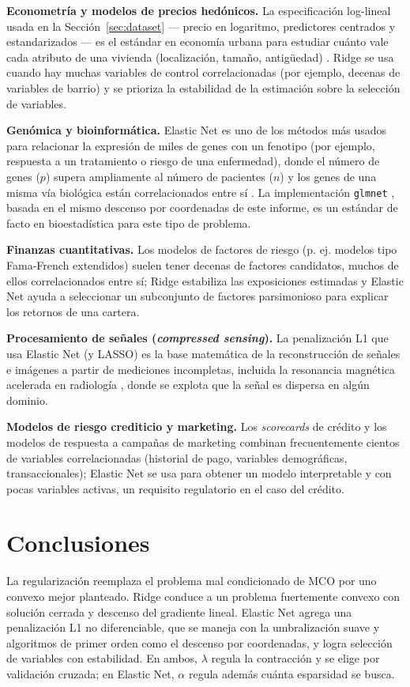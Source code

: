\documentclass[11pt,a4paper]{article}
\theoremstyle{simple}
\begin{document}
\textbf{Econometría y modelos de precios hedónicos.} La especificación log-lineal usada en la Sección~\ref{sec:dataset} --- precio en logaritmo, predictores centrados y estandarizados --- es el estándar en economía urbana para estudiar cuánto vale cada atributo de una vivienda (localización, tamaño, antigüedad) \cite{hastie2009}. Ridge se usa cuando hay muchas variables de control correlacionadas (por ejemplo, decenas de variables de barrio) y se prioriza la estabilidad de la estimación sobre la selección de variables.

\textbf{Genómica y bioinformática.} Elastic Net es uno de los métodos más usados para relacionar la expresión de miles de genes con un fenotipo (por ejemplo, respuesta a un tratamiento o riesgo de una enfermedad), donde el número de genes ($p$) supera ampliamente al número de pacientes ($n$) y los genes de una misma vía biológica están correlacionados entre sí \cite{zou2005}. La implementación \texttt{glmnet} \cite{friedman2010}, basada en el mismo descenso por coordenadas de este informe, es un estándar de facto en bioestadística para este tipo de problema.

\textbf{Finanzas cuantitativas.} Los modelos de factores de riesgo (p. ej. modelos tipo Fama-French extendidos) suelen tener decenas de factores candidatos, muchos de ellos correlacionados entre sí; Ridge estabiliza las exposiciones estimadas y Elastic Net ayuda a seleccionar un subconjunto de factores parsimonioso para explicar los retornos de una cartera.

\textbf{Procesamiento de señales (\textit{compressed sensing}).} La penalización L1 que usa Elastic Net (y LASSO) es la base matemática de la reconstrucción de señales e imágenes a partir de mediciones incompletas, incluida la resonancia magnética acelerada en radiología \cite{beck2009}, donde se explota que la señal es dispersa en algún dominio.

\textbf{Modelos de riesgo crediticio y marketing.} Los \textit{scorecards} de crédito y los modelos de respuesta a campañas de marketing combinan frecuentemente cientos de variables correlacionadas (historial de pago, variables demográficas, transaccionales); Elastic Net se usa para obtener un modelo interpretable y con pocas variables activas, un requisito regulatorio en el caso del crédito.

\section{Conclusiones}
La regularización reemplaza el problema mal condicionado de MCO por uno convexo mejor planteado. Ridge conduce a un problema fuertemente convexo con solución cerrada y descenso del gradiente lineal. Elastic Net agrega una penalización L1 no diferenciable, que se maneja con la umbralización suave y algoritmos de primer orden como el descenso por coordenadas, y logra selección de variables con estabilidad. En ambos, $\lambda$ regula la contracción y se elige por validación cruzada; en Elastic Net, $\alpha$ regula además cuánta esparsidad se busca.
\end{document}
